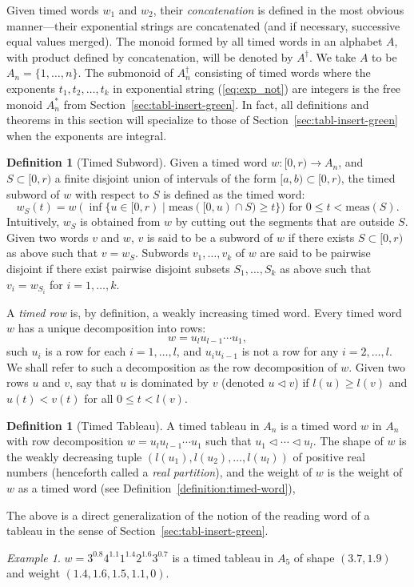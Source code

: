 \documentclass[10pt]{amsproc}
\theoremstyle{definition}
\newtheorem{definition}[theorem]{Definition}
\theoremstyle{remark}
\newtheorem{example}[theorem]{Example}
\begin{document}
Given timed words $w_1$ and $w_2$, their \emph{concatenation} is defined in the most obvious manner---their exponential strings are concatenated (and if necessary, successive equal values merged).
The monoid formed by all timed words in an alphabet $A$, with product defined by concatenation, will be denoted by $A^\dagger$.
We take $A$ to be $A_n=\{1,\dotsc,n\}$.
The submonoid of $A_n^\dagger$ consisting of timed words where the exponents $t_1,t_2,\dotsc,t_k$ in exponential string (\ref{eq:exp_not}) are integers is the free monoid $A_n^*$ from Section~\ref{sec:tabl-insert-green}.
In fact, all definitions and theorems in this section will specialize to those of Section~\ref{sec:tabl-insert-green} when the exponents are integral.

\begin{definition}
  [Timed Subword]
  \label{definition:timed-subword}
  Given a timed word $w:[0,r)\to A_n$, and $S\subset [0,r)$ a finite disjoint union of intervals of the form $[a, b)\subset [0,r)$, the timed subword of $w$ with respect to $S$ is defined as the timed word:
  \begin{displaymath}
    w_S(t) = w(\inf\{u\in [0,r)\mid \mathrm{meas}([0,u)\cap S) \geq t\}) \text{ for } 0\leq t < \mathrm{meas}(S).
  \end{displaymath}
  Intuitively, $w_S$ is obtained from $w$ by cutting out the segments that are outside $S$.
  Given two words $v$ and $w$, $v$ is said to be a subword of $w$ if there exists $S\subset [0,r)$ as above such that $v=w_S$.
  Subwords $v_1,\dotsc,v_k$ of $w$ are said to be pairwise disjoint if there exist pairwise disjoint subsets $S_1,\dotsc,S_k$ as above such that $v_i=w_{S_i}$ for $i=1,\dotsc,k$.
\end{definition}

A \emph{timed row} is, by definition, a weakly increasing timed word.
Every timed word $w$ has a unique decomposition into rows:
\begin{displaymath}
  w = u_l u_{l-1}\dotsb u_1,
\end{displaymath}
such $u_i$ is a row for each $i=1,\dotsc,l$, and $u_iu_{i-1}$ is not a row for any $i=2,\dotsc,l$.
We shall refer to such a decomposition as the row decomposition of $w$.
Given two rows $u$ and $v$, say that $u$ is dominated by $v$ (denoted $u\lhd v$) if $l(u)\geq l(v)$ and $u(t)<v(t)$ for all $0\leq t<l(v)$.
\begin{definition}[Timed Tableau]\label{definition:timed-tableau}
  A timed tableau in $A_n$ is a timed word $w$ in $A_n$ with row decomposition $w=u_l u_{l-1}\dotsb u_1$ such that $u_1\lhd \dotsb \lhd u_l$.
  The shape of $w$ is the weakly decreasing tuple $(l(u_1),l(u_2),\dotsc,l(u_l))$ of positive real numbers (henceforth called a \emph{real partition}), and the weight of $w$ is the weight of $w$ as a timed word (see Definition~\ref{definition:timed-word}),
\end{definition}
The above is a direct generalization of the notion of the reading word of a tableau in the sense of Section~\ref{sec:tabl-insert-green}.
\begin{example}
  \label{example:timed-tableau}
  $w=3^{0.8}4^{1.1}1^{1.4}2^{1.6}3^{0.7}$ is a timed tableau in $A_5$ of shape $(3.7,1.9)$ and weight $(1.4, 1.6, 1.5, 1.1,0)$.
\end{example}
\end{document}
